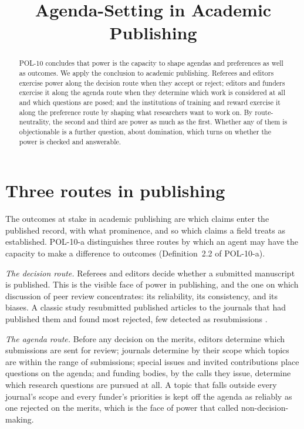 \documentclass{situationist-preprint}
\title{Agenda-Setting in Academic Publishing}
\begin{document}
\maketitle

\begin{abstract}
POL-10 concludes that power is the capacity to shape agendas and preferences as well as outcomes. We apply the conclusion to academic publishing. Referees and editors exercise power along the decision route when they accept or reject; editors and funders exercise it along the agenda route when they determine which work is considered at all and which questions are posed; and the institutions of training and reward exercise it along the preference route by shaping what researchers want to work on. By route-neutrality, the second and third are power as much as the first. Whether any of them is objectionable is a further question, about domination, which turns on whether the power is checked and answerable.
\end{abstract}

\section{Three routes in publishing}

The outcomes at stake in academic publishing are which claims enter the published record, with what prominence, and so which claims a field treats as established. POL-10-a distinguishes three routes by which an agent may have the capacity to make a difference to outcomes (Definition~2.2 of POL-10-a).

\emph{The decision route.} Referees and editors decide whether a submitted manuscript is published. This is the visible face of power in publishing, and the one on which discussion of peer review concentrates: its reliability, its consistency, and its biases. A classic study resubmitted published articles to the journals that had published them and found most rejected, few detected as resubmissions \citep{Peters1982}.

\emph{The agenda route.} Before any decision on the merits, editors determine which submissions are sent for review; journals determine by their scope which topics are within the range of submissions; special issues and invited contributions place questions on the agenda; and funding bodies, by the calls they issue, determine which research questions are pursued at all. A topic that falls outside every journal's scope and every funder's priorities is kept off the agenda as reliably as one rejected on the merits, which is the face of power that \citet{Bachrach1962} called non-decision-making.
\end{document}
